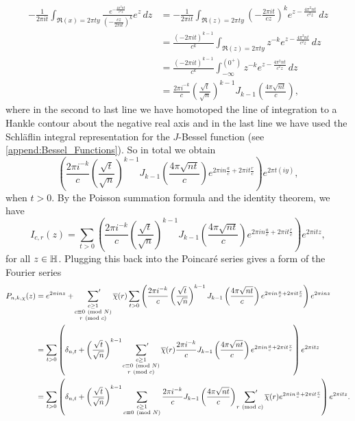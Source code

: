       \begin{align*}
        -\frac{1}{2\pi it}\int_{\Re(x) = 2\pi ty}\frac{e^{-\frac{4\pi^{2}nt}{c^{2}z}}}{\left(-\frac{cz}{2\pi it}\right)^{k}}e^{z}\,dz &= -\frac{1}{2\pi it}\int_{\Re(z) = 2\pi ty}\left(-\frac{2\pi it}{cz}\right)^{k}e^{z-\frac{4\pi^{2}nt}{c^{2}z}}\,dz \\
        &= \frac{(-2\pi it)^{k-1}}{c^{k}}\int_{\Re(z) = 2\pi ty}z^{-k}e^{z-\frac{4\pi^{2}nt}{c^{2}z}}\,dz \\
        &= \frac{(-2\pi it)^{k-1}}{c^{k}}\int_{-\infty}^{(0^{+})}z^{-k}e^{z-\frac{4\pi^{2}nt}{c^{2}z}}\,dz \\
        &= \frac{2\pi i^{-k}}{c}\left(\frac{\sqrt{t}}{\sqrt{n}}\right)^{k-1}J_{k-1}\left(\frac{4\pi\sqrt{nt}}{c}\right),
      \end{align*}
      where in the second to last line we have homotoped the line of integration to a Hankle contour about the negative real axis and in the last line we have used the Schl\"aflin integral representation for the $J$-Bessel function (see \cref{append:Bessel_Functions}). So in total we obtain
      \[
        \left(\frac{2\pi i^{-k}}{c}\left(\frac{\sqrt{t}}{\sqrt{n}}\right)^{k-1}J_{k-1}\left(\frac{4\pi\sqrt{nt}}{c}\right)e^{2\pi in\frac{a}{c}+2\pi it\frac{r}{c}}\right)e^{2\pi t(iy)},
      \]
      when $t > 0$. By the Poisson summation formula and the identity theorem, we have
      \[
        I_{c,r}(z) = \sum_{t > 0}\left(\frac{2\pi i^{-k}}{c}\left(\frac{\sqrt{t}}{\sqrt{n}}\right)^{k-1}J_{k-1}\left(\frac{4\pi\sqrt{nt}}{c}\right)e^{2\pi in\frac{a}{c}+2\pi it\frac{r}{c}}\right)e^{2\pi itz},
      \]
      for all $z \in \mathbb{H}$. Plugging this back into the Poincar\'e series gives a form of the Fourier series
      \begin{align*}
        P_{n,k,\chi}(z) &= e^{2\pi inz}+\sideset{}{'}\sum_{\substack{c \ge 1 \\ c \equiv 0 \ \left(\text{mod }N\right) \\ r \ \left(\text{mod }c\right)}}\overline{\chi}(r)\sum_{t > 0}\left(\frac{2\pi i^{-k}}{c}\left(\frac{\sqrt{t}}{\sqrt{n}}\right)^{k-1}J_{k-1}\left(\frac{4\pi\sqrt{nt}}{c}\right)e^{2\pi in\frac{a}{c}+2\pi it\frac{r}{c}}\right)e^{2\pi inz} \\
        &= \sum_{t > 0}\left(\delta_{n,t}+\left(\frac{\sqrt{t}}{\sqrt{n}}\right)^{k-1}\sideset{}{'}\sum_{\substack{c \ge 1 \\ c \equiv 0 \ \left(\text{mod }N\right) \\ r \ \left(\text{mod }c\right)}}\overline{\chi}(r)\frac{2\pi i^{-k}}{c}J_{k-1}\left(\frac{4\pi\sqrt{nt}}{c}\right)e^{2\pi in\frac{a}{c}+2\pi it\frac{r}{c}}\right)e^{2\pi itz} \\
        &= \sum_{t > 0}\left(\delta_{n,t}+\left(\frac{\sqrt{t}}{\sqrt{n}}\right)^{k-1}\sum_{\substack{c \ge 1 \\ c \equiv 0 \ \left(\text{mod }N\right)}}\frac{2\pi i^{-k}}{c}J_{k-1}\left(\frac{4\pi\sqrt{nt}}{c}\right)\sideset{}{'}\sum_{r \ \left(\text{mod }c\right)}\overline{\chi}(r)e^{2\pi in\frac{a}{c}+2\pi it\frac{r}{c}}\right)e^{2\pi itz}.
      \end{align*}
